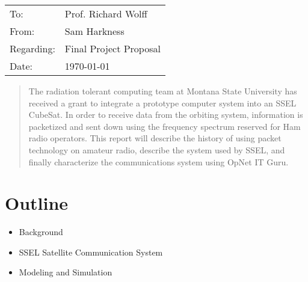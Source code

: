 \documentclass[letter,12pt]{article}
\begin{document}
	\begin{tabular}{l l}
	To: & Prof. Richard Wolff \\
	From: & Sam Harkness \\
	Regarding: & Final Project Proposal \\
	Date: & \mydate\today \\
	\end{tabular}

	\begin{abstract}
		The radiation tolerant computing team at Montana State University has received a grant to integrate a prototype computer system into an SSEL CubeSat.  In order to receive data from the orbiting system, information is packetized and sent down using the frequency spectrum reserved for Ham radio operators. This report will describe the history of using packet technology on amateur radio, describe the system used by SSEL, and finally characterize the communications system using OpNet IT Guru.
	\end{abstract}

	\section{Outline}
		\begin{itemize}
			\item Background
			\item SSEL Satellite Communication System
			\item Modeling and Simulation
		\end{itemize}
\end{document}
